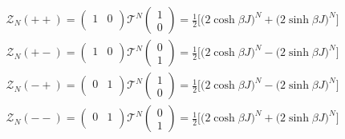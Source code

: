 \documentclass{homework}
\begin{document}
\begin{itemize}
    \begin{equation}
    \begin{array}{c}
             \mathcal{Z}_N(++) = \left(\begin{array}{cc}
        1 & 0 \\
    \end{array}\right) \bm{\mathcal{T}}^{N} \left(\begin{array}{c}
        1 \\
        0 
    \end{array}\right)  = \frac{1}{2}\bigg[\bigg(2 \cosh \beta J\bigg)^N + \bigg(2 \sinh \beta J\bigg)^N \bigg] \\
    \mathcal{Z}_N(+-) = \left(\begin{array}{cc}
        1 & 0 \\
    \end{array}\right) \bm{\mathcal{T}}^{N} \left(\begin{array}{c}
        0 \\
        1 
    \end{array}\right)  = \frac{1}{2}\bigg[\bigg(2 \cosh \beta J\bigg)^N - \bigg(2 \sinh \beta J\bigg)^N \bigg]
    \\
    \mathcal{Z}_N(-+) = \left(\begin{array}{cc}
        0 & 1 \\
    \end{array}\right) \bm{\mathcal{T}}^{N} \left(\begin{array}{c}
        1 \\
        0 
    \end{array}\right)  = \frac{1}{2}\bigg[\bigg(2 \cosh \beta J\bigg)^N - \bigg(2 \sinh \beta J\bigg)^N \bigg] \\
    \mathcal{Z}_N(--) = \left(\begin{array}{cc}
        0 & 1  \\
    \end{array}\right) \bm{\mathcal{T}}^{N} \left(\begin{array}{c}
        0 \\
        1 
    \end{array}\right)  = \frac{1}{2}\bigg[\bigg(2 \cosh \beta J\bigg)^N + \bigg(2 \sinh \beta J\bigg)^N \bigg] \\
    \end{array}
    \end{equation}
    

\end{itemize}
\end{document}
